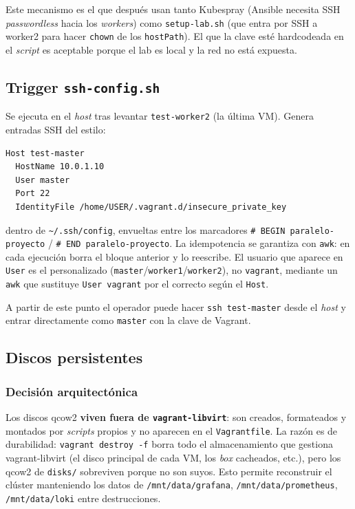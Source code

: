 Este mecanismo es el que después usan tanto Kubespray (Ansible necesita SSH \emph{passwordless} hacia los \emph{workers}) como \texttt{setup-lab.sh} (que entra por SSH a worker2 para hacer \texttt{chown} de los \texttt{hostPath}). El que la clave esté hardcodeada en el \emph{script} es aceptable porque el lab es local y la red no está expuesta.

\subsection{Trigger \texttt{ssh-config.sh}}

Se ejecuta en el \emph{host} tras levantar \texttt{test-worker2} (la última VM). Genera entradas SSH del estilo:

\begin{lstlisting}[style=bash]
Host test-master
  HostName 10.0.1.10
  User master
  Port 22
  IdentityFile /home/USER/.vagrant.d/insecure_private_key
\end{lstlisting}

dentro de \texttt{\textasciitilde/.ssh/config}, envueltas entre los marcadores \texttt{\# BEGIN paralelo-proyecto} / \texttt{\# END paralelo-proyecto}. La idempotencia se garantiza con \texttt{awk}: en cada ejecución borra el bloque anterior y lo reescribe. El usuario que aparece en \texttt{User} es el personalizado (\texttt{master}/\texttt{worker1}/\texttt{worker2}), no \texttt{vagrant}, mediante un \texttt{awk} que sustituye \texttt{User vagrant} por el correcto según el \texttt{Host}.

A partir de este punto el operador puede hacer \texttt{ssh test-master} desde el \emph{host} y entrar directamente como \texttt{master} con la clave de Vagrant.

\subsection{Discos persistentes}

\subsubsection{Decisión arquitectónica}

Los discos qcow2 \textbf{viven fuera de \texttt{vagrant-libvirt}}: son creados, formateados y montados por \emph{scripts} propios y no aparecen en el \texttt{Vagrantfile}. La razón es de durabilidad: \texttt{vagrant destroy -f} borra todo el almacenamiento que gestiona vagrant-libvirt (el disco principal de cada VM, los \emph{box} cacheados, etc.), pero los qcow2 de \texttt{disks/} sobreviven porque no son suyos. Esto permite reconstruir el clúster manteniendo los datos de \texttt{/mnt/data/grafana}, \texttt{/mnt/data/prometheus}, \texttt{/mnt/data/loki} entre destrucciones.


